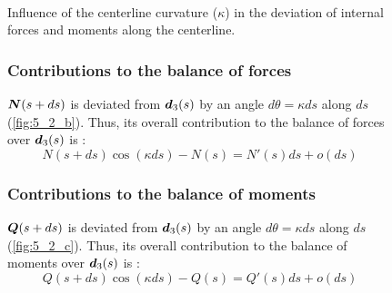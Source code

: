 \begin{figure}[p]
  \begin{leftfullpage}
    \captionsetup[subfloat]{captionskip=10pt}
     	\centering
     	 \\
	\vspace{30pt}
	\vspace{30pt}
	\caption{Influence of the centerline curvature ($\kappa$) in the deviation of internal forces and moments along the centerline.}     
	\label{fig:5_2}
 \end{leftfullpage}
\end{figure}
\begin{figure}[p]
	\begin{fullpage}
	\subsubsection{Contributions to the balance of forces}
	\vspace{10pt}
	$\boldsymbol{N}(s+ds)$ is deviated from $\boldsymbol{d}_3(s)$ by an angle $d\theta = \kappa ds$ along $ds$ (\cref{fig:5_2_b}). Thus, its overall contribution to the balance of forces over $\boldsymbol{d}_3(s)$ is : 
	\begin{equation*}
		N(s+ds) \cos(\kappa ds) - N(s) = N'(s) ds + o(ds)
	\end{equation*}	
	\vspace{10pt}
	\subsubsection{Contributions to the balance of moments}
	\vspace{10pt}
	$\boldsymbol{Q}(s+ds)$ is deviated from $\boldsymbol{d}_3(s)$ by an angle $d\theta = \kappa ds$ along $ds$ (\cref{fig:5_2_c}). Thus, its overall contribution to the balance of moments over $\boldsymbol{d}_3(s)$ is : 
	\begin{equation*}
		Q(s+ds) \cos(\kappa ds) - Q(s) = Q'(s) ds + o(ds)
	\end{equation*}	
	  \end{fullpage}
\end{figure}

 
